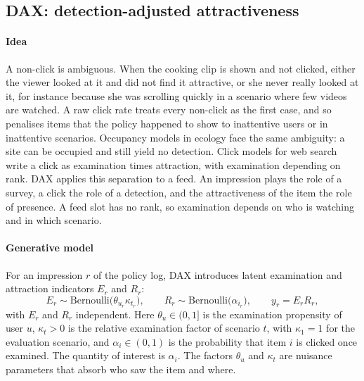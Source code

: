 \subsection{DAX: detection-adjusted attractiveness}
\label{sec:method-dax}

\paragraph{Idea} A non-click is ambiguous. When the cooking clip is shown and not clicked, either the viewer looked at it and did not find
it attractive, or she never really looked at it, for instance because she was scrolling quickly in a scenario where few videos are watched.
A raw click rate treats every non-click as the first case, and so penalises items that the policy happened to show to inattentive users or
in inattentive scenarios. Occupancy models in ecology \citep{mackenzie2002occupancy} face the same ambiguity: a site can be occupied and still
yield no detection. Click models for web search \citep{richardson2007predicting,craswell2008cascade,chuklin2015clickmodels} write a click as
examination times attraction, with examination depending on rank. DAX applies this separation to a feed. An impression plays the role of a
survey, a click the role of a detection, and the attractiveness of the item the role of presence. A feed slot has no rank, so examination
depends on who is watching and in which scenario.

\paragraph{Generative model} For an impression $r$ of the policy log, DAX introduces latent examination and attraction indicators $E_r$ and
$R_r$:
\begin{equation}
  E_r\sim\mathrm{Bernoulli}\bigl(\theta_{u_r}\kappa_{t_r}\bigr),\qquad
  R_r\sim\mathrm{Bernoulli}\bigl(\alpha_{i_r}\bigr),\qquad
  y_r=E_rR_r ,
  \label{eq:dax-model}
\end{equation}
with $E_r$ and $R_r$ independent. Here $\theta_u\in(0,1]$ is the examination propensity of user $u$, $\kappa_t>0$ is the relative
examination factor of scenario $t$, with $\kappa_1=1$ for the evaluation scenario, and $\alpha_i\in(0,1)$ is the probability that item $i$
is clicked once examined. The quantity of interest is $\alpha_i$. The factors $\theta_u$ and $\kappa_t$ are nuisance parameters that
absorb who saw the item and where.

